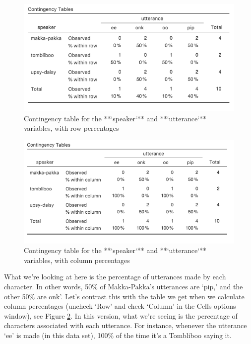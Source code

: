 \documentclass[
]{book}
\begin{document}
\begin{figure}

{\centering \includegraphics[width=1\linewidth]{img/mechanics/contingencyrow} 

}

\caption{Contingency table for the **`speaker`** and **`utterance`** variables, with row percentages}\label{fig:contingencyrow}
\end{figure}

\begin{figure}

{\centering \includegraphics[width=1\linewidth]{img/mechanics/contingencycol} 

}

\caption{Contingency table for the **`speaker`** and **`utterance`** variables, with column percentages}\label{fig:contingencycol}
\end{figure}

What we're looking at here is the percentage of utterances made by each character. In other words, 50\% of Makka-Pakka's utterances are `pip,' and the other 50\% are onk'. Let's contrast this with the table we get when we calculate column percentages (uncheck `Row' and check `Column' in the Cells options window), see Figure \ref{fig:contingencycol}. In this version, what we're seeing is the percentage of characters associated with each utterance. For instance, whenever the utterance `ee' is made (in this data set), 100\% of the time it's a Tombliboo saying it.
\end{document}
